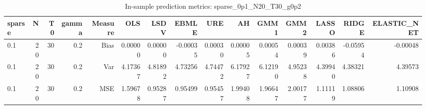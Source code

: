 \begin{table}[!htbp]\centering
\caption{In-sample prediction metrics: sparse_0p1_N20_T30_g0p2}
\label{tab:table2_sparse_0p1_N20_T30_g0p2}
\begin{tabular}{lrrrrrrrrrrrrrr}
\hline
sparse & N & T0 & gamma & Measure & OLS & LSDV & EBMLE & URE & AH & GMM1 & GMM2 & LASSO & RIDGE & ELASTIC_NET \\
\hline
0.1 & 20 & 30 & 0.2 & Bias & 0.00000 & 0.00000 & -0.00035 & 0.00030 & 0.00005 & 0.00054 & 0.00039 & 0.00386 & -0.05954 & -0.00048 \\
0.1 & 20 & 30 & 0.2 & Var & 4.17367 & 4.81892 & 4.73256 & 4.74472 & 6.17927 & 6.12190 & 4.95238 & 4.39940 & 4.38321 & 4.39573 \\
0.1 & 20 & 30 & 0.2 & MSE & 1.59678 & 0.95287 & 0.95499 & 0.95457 & 1.99408 & 1.96647 & 2.00177 & 1.11119 & 1.08806 & 1.10908 \\
\hline
\end{tabular}
\end{table}

